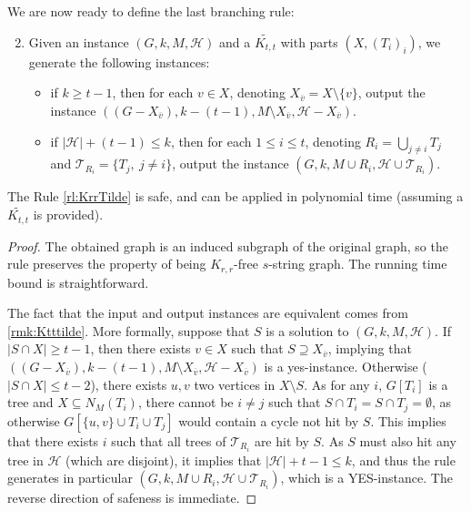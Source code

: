 \documentclass{amsart}
\newcommand{\BR}[1]{BR$_ #1$}
\newcommand{\mT}{\mathcal{T}}
\newcommand{\mH}{\mathcal{H}}
\newcommand{\KttTilde}{\widetilde{K_{t,t}}}
\newcommand{\ruleref}[1]{\hyperref[#1]{\ref*{#1}}}
\begin{document}
We are now ready to define the last branching rule:

\begin{enumerate}[label=(\BR{{\arabic*}})]
\setcounter{enumi}{1}
\item \label{rl:KrrTilde} Given an instance $(G, k, M, \mH)$ and a $\KttTilde$ with parts $(X, (T_i)_i)$, we generate the following instances:
\begin{itemize}
    \item if $k \ge t-1$, then for each $v\in X$, denoting $X_{\overline{v}}=X\setminus \{v\}$, output the instance $((G-X_{\overline{v}}), k-(t-1), M\setminus X_{\overline{v}}, \mH-X_{\overline{v}})$.
    \item if $|\mH|+(t-1) \le k$, then for each $1\leq i \leq t$, denoting $R_i=\bigcup_{j\neq i}T_j$ and $\mT_{R_i}=\{T_j,~j\neq i\}$, output the instance $\left(G, k, M\cup R_i, \mH\cup \mT_{R_i}\right)$.
\end{itemize}
\end{enumerate}

\begin{lemma}
    The Rule \ruleref{rl:KrrTilde} is safe, and can be applied in polynomial time (assuming a $\KttTilde$ is provided).
\end{lemma}
\begin{proof}
    The obtained graph is an induced subgraph of the original graph, so the rule preserves the property of being $K_{r,r}$-free $s$-string graph. The running time bound is straightforward. 
    
    The fact that the input and output instances are equivalent comes from \autoref{rmk:Ktttilde}.
    More formally, suppose that $S$ is a solution to $(G,k,M,\mH)$. If $|S \cap X| \ge t-1$, 
    then there exists $v \in X$ such that $S \supseteq X_{\overline{v}}$, implying that 
    $((G-X_{\overline{v}}), k-(t-1), M\setminus X_{\overline{v}}, \mH-X_{\overline{v}})$ is a yes-instance. Otherwise ($|S \cap X| \le t-2$), there exists $u,v$ two vertices in $X \setminus S$. As for any $i$, $G[T_i]$ is a tree and $X \subseteq N_M(T_i)$, there cannot be $i \neq j$ such that $S \cap T_i = S \cap T_j = \emptyset$, as otherwise $G[\{u,v\} \cup T_i \cup T_j]$ would contain a cycle not hit by $S$. This implies that there exists $i$ such that all trees of $\mT_{R_i}$ are hit by $S$.
    As $S$ must also hit any tree in $\mH$ (which are disjoint), it implies that $|\mH|+t-1 \le k$, and thus the rule generates in particular $\left(G, k, M\cup R_i, \mH\cup \mT_{R_i}\right)$, which is a YES-instance.
    The reverse direction of safeness is immediate.

\end{proof}
\end{document}

